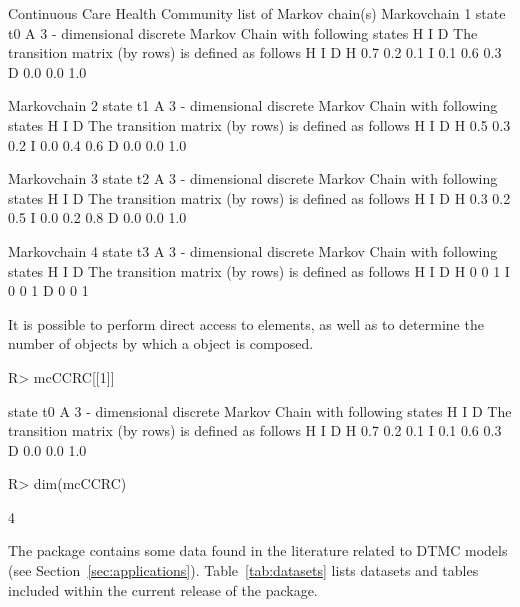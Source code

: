 \documentclass[nojss]{jss}
\begin{document}
\begin{Schunk}
\begin{Soutput}
Continuous Care Health Community  list of Markov chain(s) 
Markovchain  1 
state t0 
 A  3 - dimensional discrete Markov Chain with following states 
 H I D 
 The transition matrix   (by rows)  is defined as follows 
    H   I   D
H 0.7 0.2 0.1
I 0.1 0.6 0.3
D 0.0 0.0 1.0

Markovchain  2 
state t1 
 A  3 - dimensional discrete Markov Chain with following states 
 H I D 
 The transition matrix   (by rows)  is defined as follows 
    H   I   D
H 0.5 0.3 0.2
I 0.0 0.4 0.6
D 0.0 0.0 1.0

Markovchain  3 
state t2 
 A  3 - dimensional discrete Markov Chain with following states 
 H I D 
 The transition matrix   (by rows)  is defined as follows 
    H   I   D
H 0.3 0.2 0.5
I 0.0 0.2 0.8
D 0.0 0.0 1.0

Markovchain  4 
state t3 
 A  3 - dimensional discrete Markov Chain with following states 
 H I D 
 The transition matrix   (by rows)  is defined as follows 
  H I D
H 0 0 1
I 0 0 1
D 0 0 1
\end{Soutput}
\end{Schunk}

It is possible to perform direct access to  elements, as well as to 
determine the number of  objects by which a  object is composed.

\begin{Schunk}
\begin{Sinput}
R> mcCCRC[[1]]
\end{Sinput}
\begin{Soutput}
state t0 
 A  3 - dimensional discrete Markov Chain with following states 
 H I D 
 The transition matrix   (by rows)  is defined as follows 
    H   I   D
H 0.7 0.2 0.1
I 0.1 0.6 0.3
D 0.0 0.0 1.0
\end{Soutput}
\begin{Sinput}
R> dim(mcCCRC)
\end{Sinput}
\begin{Soutput}
[1] 4
\end{Soutput}
\end{Schunk}

The  package contains some data found in the
literature related to DTMC models (see Section~\ref{sec:applications}).
Table~\ref{tab:datasets} lists datasets and tables included within the current release of
the package.
\end{document}
